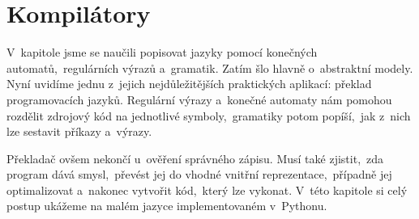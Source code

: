 \chapter{Kompilátory}\label{chap:kompilatory}

V~kapitole  jsme se naučili popisovat jazyky pomocí konečných automatů,~regulárních výrazů a~gramatik. Zatím šlo hlavně o~abstraktní modely. Nyní uvidíme jednu z~jejich nejdůležitějších praktických aplikací: překlad programovacích jazyků. Regulární výrazy a~konečné automaty nám pomohou rozdělit zdrojový kód na jednotlivé symboly,~gramatiky potom popíší,~jak z~nich lze sestavit příkazy a~výrazy.

Překladač ovšem nekončí u~ověření správného zápisu. Musí také zjistit,~zda program dává smysl,~převést jej do vhodné vnitřní reprezentace,~případně jej optimalizovat a~nakonec vytvořit kód,~který lze vykonat. V~této kapitole si celý postup ukážeme na malém jazyce implementovaném v~Pythonu.







